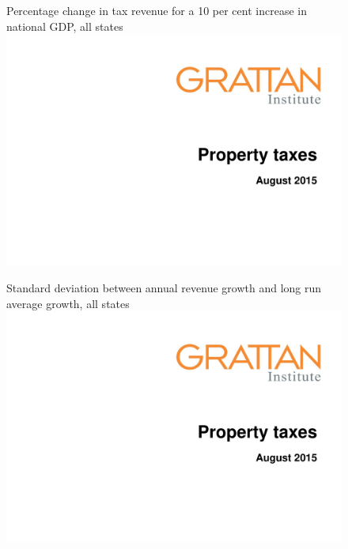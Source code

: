 \documentclass[twoside,english]{grattanBudgetRepairb5portrait}
\begin{document}
\begin{subappendices}
\begin{figure}
%
{Percentage change in tax revenue for a 10 per cent increase in national GDP, all states}
\includegraphics[width=\columnwidth,page=22]{Property-taxes/atlas/PPTXProperty.pdf}
\propPhantomNotes
\end{figure}

\begin{figure}
%
{Standard deviation between annual revenue growth and long run average growth, all states}
\includegraphics[width=\columnwidth,page=23]{Property-taxes/atlas/PPTXProperty.pdf}
\propPhantomNotes
\end{figure}


\end{subappendices}
\end{document}
